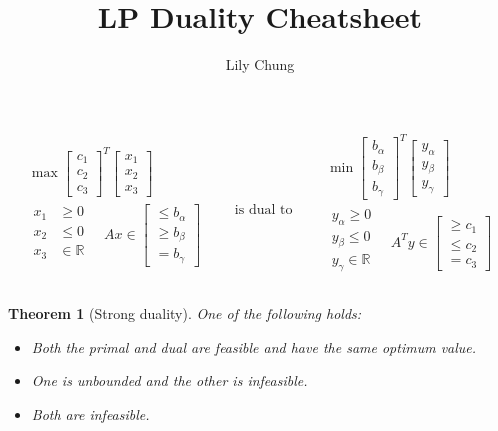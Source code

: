 \documentclass{article}
\title{LP Duality Cheatsheet}
\author{Lily Chung}
\date{}
\newtheorem{theorem}{Theorem}
\newcommand*{\mat}[1]{\begin{bmatrix}#1\end{bmatrix}}
\newcommand*{\R}[0]{\mathbb{R}}
\begin{document}
\maketitle

\begin{tcolorbox}
  \[
  \begin{gathered}
    \max\mat{c_1 \\ c_2 \\ c_3}^T \mat{x_1 \\ x_2 \\ x_3} \\
    \begin{aligned}
      x_1 &\ge 0 \\
      x_2 &\le 0 \\
      x_3 &\in \R \\
    \end{aligned}\quad
    Ax \in \mat{\le b_\alpha \\ \ge b_\beta \\ = b_\gamma} \\
  \end{gathered}
  \qquad\text{is dual to}\qquad
  \begin{gathered}
    \min\mat{b_\alpha \\ b_\beta \\ b_\gamma}^T \mat{y_\alpha \\ y_\beta \\ y_\gamma} \\
    \begin{aligned}
      y_\alpha \ge 0 \\
      y_\beta \le 0 \\
      y_\gamma \in \R \\
    \end{aligned}\quad
    A^Ty \in \mat{\ge c_1 \\ \le c_2 \\ = c_3} \\
  \end{gathered}
  \]
\end{tcolorbox}
\begin{theorem}[Strong duality]
  One of the following holds:
  \begin{itemize}
  \item Both the primal and dual are feasible and have the same optimum value.
  \item One is unbounded and the other is infeasible.
  \item Both are infeasible.
  \end{itemize}
\end{theorem}
\end{document}
